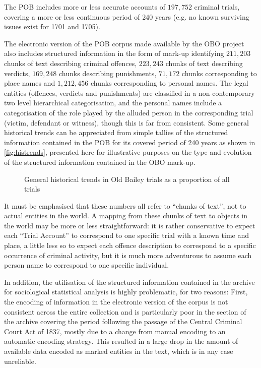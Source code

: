 The POB includes more or less accurate accounts of $197,752$ criminal trials, covering a more or less continuous period of 240 years (e.g. no known surviving issues exist for 1701 and 1705).

The electronic version of the POB corpus made available by the OBO project also includes structured information in the form of mark-up identifying $211,203$ chunks of text describing criminal offences, $223,243$ chunks of text describing verdicts, $169,248$ chunks describing punishments, $71,172$ chunks corresponding to place names and $1,212,456$ chunks corresponding to personal names.
The legal entities (offences, verdicts and punishments) are classified in a non-contemporary two level hierarchical categorisation, and the personal names include a categorisation of the role played by the alluded person in the corresponding trial (victim, defendant or witness), though this is far from consistent.
Some general historical trends can be appreciated from simple tallies of the structured information contained in the POB for its covered period of 240 years as shown in \autoref{fig:histrends}, presented here for illustrative purposes on the type and evolution of the structured information contained in the OBO mark-up.

\begin{figure}
    \centerfloat
    
    \caption[General historical trends in Old Bailey trials]{
        General historical trends in Old Bailey trials as a proportion of all trials
    }
    \label{fig:histrends}
\end{figure}

It must be emphasised that these numbers all refer to ``chunks of text'', not to actual entities in the world.
A mapping from these chunks of text to objects in the world may be more or less straightforward: it is rather conservative to expect each ``Trial Account'' to correspond to one specific trial with a known time and place, a little less so to expect each offence description to correspond to a specific occurrence of criminal activity, but it is much more adventurous to assume each person name to correspond to one specific individual.

In addition, the utilisation of the structured information contained in the archive for sociological statistical analysis is highly problematic, for two reasons:
First, the encoding of information in the electronic version of the corpus is not consistent across the entire collection and is particularly poor in the section of the archive covering the period following the passage of the Central Criminal Court Act of 1837, mostly due to a change from manual encoding to an automatic encoding strategy.
This resulted in a large drop in the amount of available data encoded as marked entities in the text, which is in any case unreliable.

